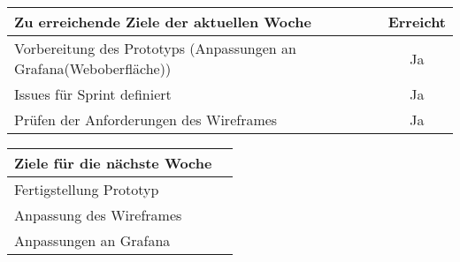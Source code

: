 \begin{tabularx}{\textwidth}{Xc}
    \arrayrulecolor{OliveGreen}
    \toprule
    {\bfseries Zu erreichende Ziele der aktuellen Woche} & {\bfseries Erreicht} \\
    \midrule[2pt]
    Vorbereitung des Prototyps (Anpassungen an Grafana(Weboberfläche))   &Ja                    \\
    \rowcolor{OliveGreen!15}
    Issues für Sprint definiert                                          &Ja                    \\
    \rowcolor{OliveGreen!15}
    Prüfen der Anforderungen des Wireframes                              &Ja                    \\
   \bottomrule[2pt]
\end{tabularx}
%
\vspace{1cm}
%
\begin{tabularx}{\textwidth}{Xc}
    \arrayrulecolor{OliveGreen}
    \toprule
    {\bfseries Ziele für die nächste Woche}          &                      \\
    \midrule[2pt]
    Fertigstellung Prototyp                          &                      \\
    \rowcolor{OliveGreen!15}
    Anpassung des Wireframes                         &                      \\
    \rowcolor{OliveGreen!15}
    Anpassungen an Grafana                           &                      \\
\end{tabularx}
